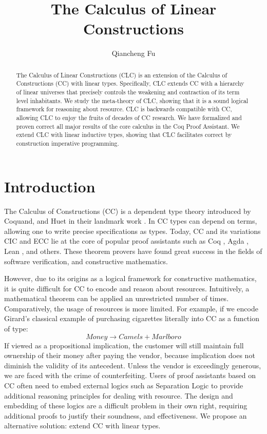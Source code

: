 \documentclass[sigplan,screen,review,authordraft]{acmart}
\title{The Calculus of Linear Constructions}
\author{Qiancheng Fu}
\affiliation{
  \institution{Boston University}
  \city{Boston}
  \state{MA}
  \country{USA}
}
\theoremstyle{definition}
\begin{document}
  \begin{abstract}
    The Calculus of Linear Constructions (CLC) is an extension of the Calculus of Constructions (CC) with linear types. Specifically, CLC extends CC with a hierarchy of linear universes that precisely controls the weakening and contraction of its term level inhabitants. We study the meta-theory of CLC, showing that it is a sound logical framework for reasoning about resource. CLC is backwards compatible with CC, allowing CLC to enjoy the fruits of decades of CC research. We have formalized and proven correct all major results of the core calculus in the Coq Proof Assistant. We extend CLC with linear inductive types, showing that CLC facilitates correct by construction imperative programming.
  \end{abstract}
  \maketitle 

  \section{Introduction}
  The Calculus of Constructions (CC) is a dependent type theory introduced by Coquand, and Huet in their landmark work \cite{cc}. In CC types can depend on terms, allowing one to write precise specifications as types. Today, CC and its variations CIC \cite{cic} and ECC \cite{ecc} lie at the core of popular proof assistants such as Coq \cite{coq}, Agda \cite{agda}, Lean \cite{lean}, and others. These theorem provers have found great success in the fields of software verification, and constructive mathematics. 
  
  However, due to its origins as a logical framework for constructive mathematics, it is quite difficult for CC to encode and reason about resources. Intuitively, a mathematical theorem can be applied an unrestricted number of times. Comparatively, the usage of resources is more limited. For example, if we encode Girard's classical example \cite{girard95} of purchasing cigarettes literally into CC as a function of type:
  \begin{equation*}
    Money \rightarrow Camels + Marlboro
  \end{equation*}
  If viewed as a propositional implication, the customer will still maintain full ownership of their money after paying the vendor, because implication does not diminish the validity of its antecedent. Unless the vendor is exceedingly generous, we are faced with the crime of counterfeiting. Users of proof assistants based on CC often need to embed external logics such as Separation Logic to provide additional reasoning principles for dealing with resource. The design and embedding of these logics are a difficult problem in their own right, requiring additional proofs to justify their soundness, and effectiveness. We propose an alternative solution: extend CC with linear types.
\end{document}
